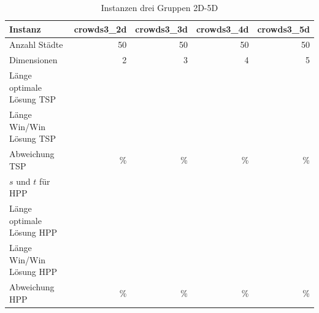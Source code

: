 \documentclass[11pt,a4paper]{article}
\begin{document}
\begin{table}[H]
        \centering
        \begin{tabular}{| l | r | r | r | r |}
            \hline
            Instanz                     & \textbf{crowds3\_2d}     
                                        & \textbf{crowds3\_3d}     
                                        & \textbf{crowds3\_4d}     
                                        & \textbf{crowds3\_5d}             \\ \hline
                Anzahl Städte               & 50        & 50       & 50         & 50        \\ \hline
                Dimensionen                 & 2         & 3        & 4          & 5         \\ \hline
                Länge optimale Lösung TSP   &           &          &            &           \\ \hline
                Länge Win/Win Lösung  TSP   &           &          &            &           \\ \hline
                Abweichung TSP              &     \%    &      \%  &      \%    &      \%   \\ \hline
                $s$ und $t$ für HPP         &           &          &            &           \\ \hline
                Länge optimale Lösung HPP   &           &          &            &           \\ \hline
                Länge Win/Win Lösung  HPP   &           &          &            &           \\ \hline
                Abweichung HPP              &     \%    &     \%   &     \%     &      \%   \\ \hline
        \end{tabular}
        \caption{Instanzen drei Gruppen 2D-5D}
        \label{tab:instanzen_crowds3}
\end{table}
\end{document}
